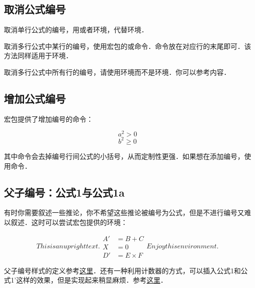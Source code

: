 \subsection{取消公式编号}
取消单行公式的编号，用\latexline{[\char`\\]}或者环境，代替环境．

取消多行公式中某行的编号，使用宏包的或命令．命令放在对应行的末尾即可．该方法同样适用于环境．

取消多行公式中所有行的编号，请使用环境而不是环境．你可以参考内容．

\subsection{增加公式编号}
宏包提供了增加编号的命令：

\begin{codeshow}
\[a^2>0 \tag{$\star$}\]
\begin{equation}
b^2 \geqslant 0
\tag*{[Axiom]}
\end{equation}
\end{codeshow}

其中命令会去掉编号行间公式的小括号，从而定制性更强．如果想在添加编号，使用命令．

\subsection{父子编号：公式1与公式1a}
有时你需要叙述一些推论，你不希望这些推论被编号为公式，但是不进行编号又难以叙述．这时可以尝试宏包提供的环境：

\begin{codeshow}
\begin{subequations}
This is an upright text.
\begin{align}
A' &=B+C \\
X &=0 \nonumber \\
D' &=E \times F
\end{align}
Enjoy this environment.
\end{subequations}
\end{codeshow}

父子编号样式的定义参考\hyperref[code:parenteqnum]{这里}．还有一种利用计数器的方式，可以插入公式1和公式1'这样的效果，但是实现起来稍显麻烦．参考\hyperref[code:eq1plus]{这里}．

